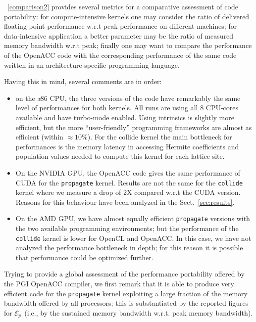 \documentclass[times]{cpeauth}
\newcommand{\bi}{\begin{itemize}}
\newcommand{\ei}{\end{itemize}}
\begin{document}

\tablename~\ref{comparison2} provides several metrics for a comparative 
assessment of code portability: for compute-intensive kernels  
one may consider the ratio of delivered floating-point performance w.r.t 
peak performance on different machines; 
%
for data-intensive application a better parameter may be the ratio of measured 
memory bandwidth w.r.t peak; 
%
finally one may want to compare the performance of the OpenACC code with the 
corresponding performance of the same code written in an architecture-specific 
programming language. 

Having this in mind, several comments are in order:
%
\bi
%
\item 
on the {\em x}86 CPU, the three versions of the code have remarkably the 
same level of performances for both kernels. All runs are using all 8 CPU-cores available and have turbo-mode enabled. Using intrinsics is slightly 
more efficient, but the more ``user-friendly'' programming frameworks are 
almost as efficient (within $\approx 10\%$). For the collide 
kernel the main bottleneck for performances is the memory latency in accessing 
Hermite coefficients and population values needed to compute this kernel 
for each lattice site.
%
\item 
On the NVIDIA GPU, the OpenACC code gives the same performance of 
CUDA for the {\tt propagate} kernel. 
Results are not the same for the {\tt collide} kernel where we measure a drop of 2X 
compared w.r.t the CUDA version. Reasons for this behaviour have been 
analyzed in the Sect.~\ref{sec:results}.
%
\item
On the AMD GPU, we have almost equally efficient {\tt propagate} versions 
with the two available programming environments; but the performance of the {\tt collide}
kernel is lower for OpenCL and OpenACC. In this case, we have not analyzed 
the performance bottleneck in depth; 
for this reason it is possible that performance could be optimized further.
%
\ei
 
Trying to provide a global assessment of the performance portability offered 
by the PGI OpenACC compiler, we first remark that it is able to produce very 
efficient code for the {\tt propagate} kernel exploiting a large fraction of 
the memory bandwidth offered by all processors; this is substantiated by the 
reported figures for ${\cal E}_p$ (i.e., by the sustained memory bandwidth 
w.r.t. peak memory bandwidth).
\end{document}
